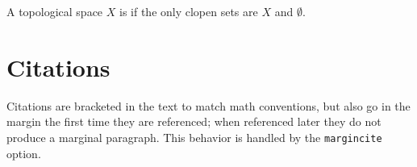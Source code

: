 \documentclass[margincite]{sl2art}
\begin{document}
\begin{definition}
  A topological space \(X\) is  if the only clopen sets are \(X\) and \(\emptyset\).
\end{definition}



\section{Citations}
Citations are bracketed in the text \cite{Graham1994} to match math conventions, but also go in the margin the first time they are referenced; when referenced later \cite{Graham1994} they do not produce a marginal paragraph.
This behavior is handled by the \texttt{margincite} option.


\printbibliography
  
\end{document}
